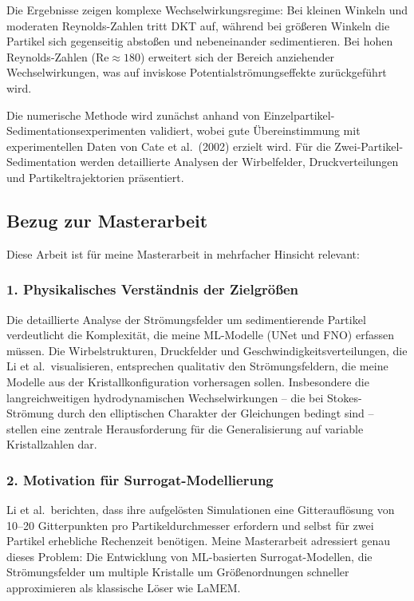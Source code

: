 \documentclass[a4paper,12pt]{article}
\begin{document}
Die Ergebnisse zeigen komplexe Wechselwirkungsregime: Bei kleinen Winkeln und moderaten Reynolds-Zahlen tritt DKT auf, w\"ahrend bei gr\"o{\ss}eren Winkeln die Partikel sich gegenseitig absto{\ss}en und nebeneinander sedimentieren. Bei hohen Reynolds-Zahlen ($\mathrm{Re} \approx 180$) erweitert sich der Bereich anziehender Wechselwirkungen, was auf inviskose Potentialstr\"omungseffekte zur\"uckgef\"uhrt wird.

Die numerische Methode wird zun\"achst anhand von Einzelpartikel-Sedimentationsexperimenten validiert, wobei gute \"Ubereinstimmung mit experimentellen Daten von Cate et al.\ (2002) erzielt wird. F\"ur die Zwei-Partikel-Sedimentation werden detaillierte Analysen der Wirbelfelder, Druckverteilungen und Partikeltrajektorien pr\"asentiert.

\subsection*{Bezug zur Masterarbeit}

Diese Arbeit ist f\"ur meine Masterarbeit in mehrfacher Hinsicht relevant:

\subsubsection*{1. Physikalisches Verst\"andnis der Zielgr\"o{\ss}en}

Die detaillierte Analyse der Str\"omungsfelder um sedimentierende Partikel verdeutlicht die Komplexit\"at, die meine ML-Modelle (UNet und FNO) erfassen m\"ussen. Die Wirbelstrukturen, Druckfelder und Geschwindigkeitsverteilungen, die Li et al.\ visualisieren, entsprechen qualitativ den Str\"omungsfeldern, die meine Modelle aus der Kristallkonfiguration vorhersagen sollen. Insbesondere die langreichweitigen hydrodynamischen Wechselwirkungen -- die bei Stokes-Str\"omung durch den elliptischen Charakter der Gleichungen bedingt sind -- stellen eine zentrale Herausforderung f\"ur die Generalisierung auf variable Kristallzahlen dar.

\subsubsection*{2. Motivation f\"ur Surrogat-Modellierung}

Li et al.\ berichten, dass ihre aufgel\"osten Simulationen eine Gitteraufl\"osung von 10--20 Gitterpunkten pro Partikeldurchmesser erfordern und selbst f\"ur zwei Partikel erhebliche Rechenzeit ben\"otigen. Meine Masterarbeit adressiert genau dieses Problem: Die Entwicklung von ML-basierten Surrogat-Modellen, die Str\"omungsfelder um multiple Kristalle um Gr\"o{\ss}enordnungen schneller approximieren als klassische L\"oser wie LaMEM.
\end{document}
